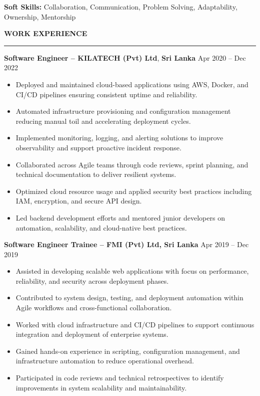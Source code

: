 \documentclass[10pt,letterpaper]{article}
\begin{document}
\textbf{Soft Skills:} Collaboration, Communication, Problem Solving, Adaptability, Ownership, Mentorship

\vspace{8pt}

\textbf{WORK EXPERIENCE}\\[-8pt]
\noindent\rule{\textwidth}{1pt}

\vspace{-2pt}

\textbf{Software Engineer -- KILATECH (Pvt) Ltd}, \textbf{Sri Lanka} \hfill Apr 2020 -- Dec 2022

\vspace{-1pt}

\begin{itemize}
\item Deployed and maintained cloud-based applications using AWS, Docker, and CI/CD pipelines ensuring consistent uptime and reliability.
\item Automated infrastructure provisioning and configuration management reducing manual toil and accelerating deployment cycles.
\item Implemented monitoring, logging, and alerting solutions to improve observability and support proactive incident response.
\item Collaborated across Agile teams through code reviews, sprint planning, and technical documentation to deliver resilient systems.
\item Optimized cloud resource usage and applied security best practices including IAM, encryption, and secure API design.
\item Led backend development efforts and mentored junior developers on automation, scalability, and cloud-native best practices.
\end{itemize}

\textbf{Software Engineer Trainee -- FMI (Pvt) Ltd, Sri Lanka} \hfill Apr 2019 -- Dec 2019

\vspace{-1pt}

\begin{itemize}
\item Assisted in developing scalable web applications with focus on performance, reliability, and security across deployment phases.
\item Contributed to system design, testing, and deployment automation within Agile workflows and cross-functional collaboration.
\item Worked with cloud infrastructure and CI/CD pipelines to support continuous integration and deployment of enterprise systems.
\item Gained hands-on experience in scripting, configuration management, and infrastructure automation to reduce operational overhead.
\item Participated in code reviews and technical retrospectives to identify improvements in system scalability and maintainability.
\end{itemize}
\end{document}
